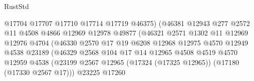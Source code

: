 \begin{lexlean}{RustStd}
\begin{coremodule}
                                        @17704
                                        @17707
                                        @17710
                                        @17714
                                        @17719
                                        @46375)
                                      (@46381
                                        @12943
                                        @277
                                        @2572
                                        @11
                                        @4508
                                        @4866
                                        @12969
                                        @12978
                                        @49877
                                        (@46321
                                          @2571
                                          @1302
                                          @11
                                          @12969
                                          @12976
                                          @4704
                                          (@46330
                                            @2570
                                            @17
                                            @19
                                            @6208
                                            @12968
                                            @12975
                                            @4570
                                            @12949
                                            @4538
                                            @23189
                                            (@46329
                                              @2568
                                              @104
                                              @17
                                              @14
                                              @12965
                                              @4508
                                              @4519
                                              @4570
                                              @12959
                                              @4538
                                              (@23199
                                                @2567
                                                @12965
                                                (@17324 (@17325 @12965))
                                                (@17180 (@17330 @2567 @17)))
                                              @23225
                                              @17260

\end{coremodule}
\end{lexlean}
